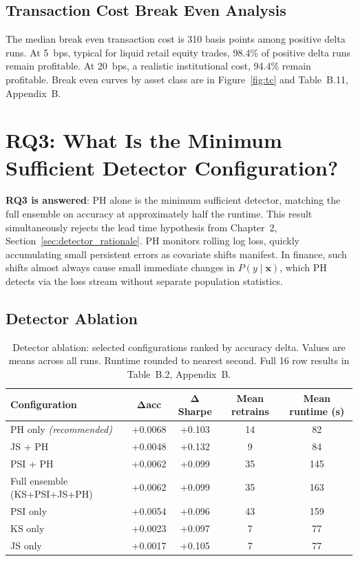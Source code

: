 \subsection{Transaction Cost Break Even Analysis}
\label{subsec:tc}

The median break even transaction cost is 310 basis points among positive delta runs. At 5~bps, typical for liquid retail equity trades, 98.4\% of positive delta runs remain profitable. At 20~bps, a realistic institutional cost, 94.4\% remain profitable. Break even curves by asset class are in Figure~\ref{fig:tc} and Table~B.11, Appendix~B.

\section{RQ3: What Is the Minimum Sufficient Detector Configuration?}
\label{sec:rq3}

\textbf{RQ3 is answered}: PH alone is the minimum sufficient detector, matching the full ensemble on accuracy at approximately half the runtime. This result simultaneously rejects the lead time hypothesis from Chapter~2, Section~\ref{sec:detector_rationale}. PH monitors rolling log loss, quickly accumulating small persistent errors as covariate shifts manifest. In finance, such shifts almost always cause small immediate changes in \(P(y \mid \mathbf{x})\), which PH detects via the loss stream without separate population statistics.

\subsection{Detector Ablation}
\label{subsec:det_ablation}

\begin{table}[htbp]
  \centering
  \caption{Detector ablation: selected configurations ranked by accuracy delta.
    Values are means across all runs. Runtime rounded to nearest second.
    Full 16 row results in Table~B.2, Appendix~B.}
  \label{tab:det_ablation_summary}
  \begin{tabular}{lcccc}
    \hline
    \textbf{Configuration} & $\bm{\Delta}$\textbf{acc}
      & $\bm{\Delta}$\textbf{Sharpe} & \textbf{Mean retrains}
      & \textbf{Mean runtime (s)} \\
    \hline
    PH only \emph{(recommended)} & +0.0068 & +0.103 & 14 &  82 \\
    JS + PH                      & +0.0048 & +0.132 &  9 &  84 \\
    PSI + PH                     & +0.0062 & +0.099 & 35 & 145 \\
    Full ensemble (KS+PSI+JS+PH) & +0.0062 & +0.099 & 35 & 163 \\
    PSI only                     & +0.0054 & +0.096 & 43 & 159 \\
    KS only                      & +0.0023 & +0.097 &  7 &  77 \\
    JS only                      & +0.0017 & +0.105 &  7 &  77 \\
    \hline
  \end{tabular}
\end{table}

